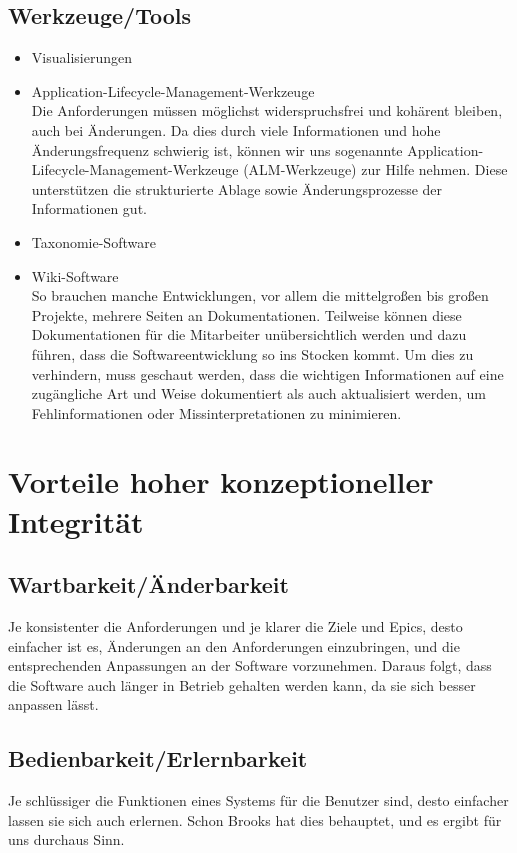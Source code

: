\documentclass[a4paper, ngerman, 12pt, usenames, dvipsnames]{article}
\begin{document}
\subsection{Werkzeuge/Tools}
\begin{itemize}
\item Visualisierungen\\
\item Application-Lifecycle-Management-Werkzeuge\\
Die Anforderungen müssen möglichst widerspruchsfrei und kohärent bleiben, auch bei Änderungen. Da dies durch viele Informationen und hohe Änderungsfrequenz schwierig ist, können wir uns sogenannte Application-Lifecycle-Management-Werkzeuge (ALM-Werkzeuge) zur Hilfe nehmen. Diese unterstützen die strukturierte Ablage sowie Änderungsprozesse der Informationen gut.\
\item Taxonomie-Software\\
\item Wiki-Software\\
So brauchen manche Entwicklungen, vor allem die mittelgroßen bis großen Projekte, mehrere Seiten an Dokumentationen. Teilweise können diese Dokumentationen für die Mitarbeiter unübersichtlich werden und dazu führen, dass die Softwareentwicklung so ins Stocken kommt. Um dies zu verhindern, muss geschaut werden, dass die wichtigen Informationen auf eine zugängliche Art und Weise dokumentiert als auch aktualisiert werden, um Fehlinformationen oder Missinterpretationen zu minimieren.
\end{itemize}
\section{Vorteile hoher konzeptioneller Integrität}
\subsection{Wartbarkeit/Änderbarkeit}
Je konsistenter die Anforderungen und je klarer die Ziele und Epics, desto einfacher ist es, Änderungen an den Anforderungen einzubringen, und die entsprechenden Anpassungen an der Software vorzunehmen. Daraus folgt, dass die Software auch länger in Betrieb gehalten werden kann, da sie sich besser anpassen lässt.
\subsection{Bedienbarkeit/Erlernbarkeit}
Je schlüssiger die Funktionen eines Systems für die Benutzer sind, desto einfacher lassen sie sich auch erlernen. Schon Brooks hat dies behauptet, und es ergibt für uns durchaus Sinn.
\end{document}
